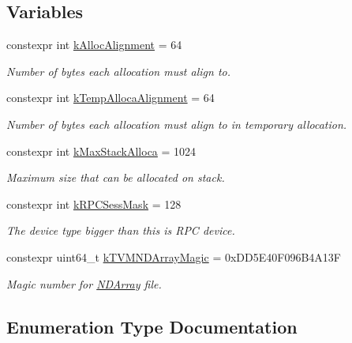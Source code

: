 \subsection*{Variables}
\begin{DoxyCompactItemize}
\item 
constexpr int \hyperlink{namespacetvm_1_1runtime_ac8a77303649fb143634796b3dc50a286}{k\+Alloc\+Alignment} = 64
\begin{DoxyCompactList}\small\item\em Number of bytes each allocation must align to. \end{DoxyCompactList}\item 
constexpr int \hyperlink{namespacetvm_1_1runtime_a8f5819cabea098a1818cf7cda40fdb1f}{k\+Temp\+Alloca\+Alignment} = 64
\begin{DoxyCompactList}\small\item\em Number of bytes each allocation must align to in temporary allocation. \end{DoxyCompactList}\item 
constexpr int \hyperlink{namespacetvm_1_1runtime_a2f6f769f6dbbbb24929b7c9f91a48c90}{k\+Max\+Stack\+Alloca} = 1024
\begin{DoxyCompactList}\small\item\em Maximum size that can be allocated on stack. \end{DoxyCompactList}\item 
constexpr int \hyperlink{namespacetvm_1_1runtime_a48cbe06e6c95ca6fabc20dd1cbacc2c9}{k\+R\+P\+C\+Sess\+Mask} = 128
\begin{DoxyCompactList}\small\item\em The device type bigger than this is R\+PC device. \end{DoxyCompactList}\item 
constexpr uint64\+\_\+t \hyperlink{namespacetvm_1_1runtime_acf4599f17bfe79ae1fe8afc1af053b43}{k\+T\+V\+M\+N\+D\+Array\+Magic} = 0x\+D\+D5\+E40\+F096\+B4\+A13F
\begin{DoxyCompactList}\small\item\em Magic number for \hyperlink{classtvm_1_1runtime_1_1NDArray}{N\+D\+Array} file. \end{DoxyCompactList}\end{DoxyCompactItemize}


\subsection{Enumeration Type Documentation}
